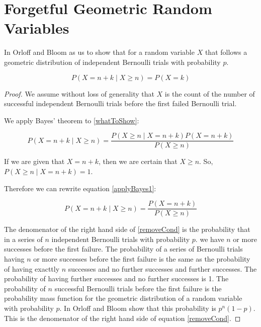 \documentclass[a4paper,11pt]{article}
\begin{document}
\section{Forgetful Geometric Random Variables}

In \cite{slides4} Orloff and Bloom as us to show that for a random
variable $X$ that follows a geometric distribution of independent 
Bernoulli trials with probability $p$.

\begin{equation} \label{whatToShow}
P \left( X = n + k \mid X \geq n \right) = P \left( X = k \right)
\end{equation}

\begin{proof}


We assume without loss of generality that $X$ is the count of the 
number of successful independent Bernoulli trials before the first
failed Bernoulli trial.

We apply Bayes' theorem \cite{reading3} to \ref{whatToShow}:

\begin{equation}\label{applyBayes1}
P \left( X = n + k \mid X \geq n \right) = 
  \frac
  { 
    P \left( X \geq n \mid X = n + k  \right) P \left( X = n + k \right)
  }
  {
    P \left( X \geq n \right)
  }
\end{equation}

If we are given that
$X = n + k$, then we are certain that $X \geq n$. So,
$P \left( X \geq n \mid X = n + k  \right) = 1$.  

Therefore we can rewrite equation \ref{applyBayes1}:

\begin{equation}\label{removeCond}
P \left( X = n + k \mid X \geq n \right) = 
  \frac
  { 
    P \left( X = n + k \right)
  }
  {
    P \left( X \geq n \right)
  }
\end{equation}

The denomenator of the right hand side of \ref{removeCond} is the
probability that in a series of $n$ independent Bernoulli trials with
probability $p$.  
we have $n$ or more successes before the first failure. The probability
of a series of Bernoulli trials having $n$ or more successes before the
first failure is the same as the probability of having exacttly $n$ 
successes and no further successes and further successes.  The 
probability of having further successes and no further successes is 1. 
The probability of $n$  successful Bernoulli trials before the first 
failure is the probability mass function for the geometric distribution
of a random variable with probability $p$.
In \cite{reading4} Orloff and Bloom show that this probability is 
$p^{n}\left( 1 - p \right) $.  This is the denomenator of 
the right hand side of equation \ref{removeCond}.


\end{proof}
\end{document}
